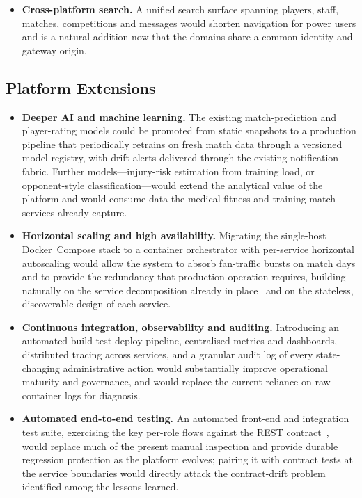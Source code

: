 \begin{itemize}
  \item \textbf{Cross-platform search.} A unified search surface spanning players, staff,
        matches, competitions and messages would shorten navigation for power users and is a
        natural addition now that the domains share a common identity and gateway origin.
\end{itemize}

\subsection{Platform Extensions}

\begin{itemize}
  \item \textbf{Deeper AI and machine learning.} The existing match-prediction and
        player-rating models could be promoted from static snapshots to a production
        pipeline that periodically retrains on fresh match data through a versioned
        model registry, with drift alerts delivered through the existing notification
        fabric. Further models---injury-risk estimation from training load, or
        opponent-style classification---would extend the analytical value of the
        platform and would consume data the medical-fitness and training-match services
        already capture.

  \item \textbf{Horizontal scaling and high availability.} Migrating the
        single-host Docker~Compose stack to a container orchestrator with
        per-service horizontal autoscaling would allow the system to absorb fan-traffic
        bursts on match days and to provide the redundancy that production operation
        requires, building naturally on the service decomposition already in
        place~\cite{microservices} and on the stateless, discoverable design of each
        service.

  \item \textbf{Continuous integration, observability and auditing.} Introducing an
        automated build-test-deploy pipeline, centralised metrics and dashboards,
        distributed tracing across services, and a granular audit log of every
        state-changing administrative action would substantially improve operational
        maturity and governance, and would replace the current reliance on raw container
        logs for diagnosis.

  \item \textbf{Automated end-to-end testing.} An automated front-end and integration
        test suite, exercising the key per-role flows against the REST
        contract~\cite{restapi}, would replace much of the present manual inspection
        and provide durable regression protection as the platform evolves; pairing it with
        contract tests at the service boundaries would directly attack the contract-drift
        problem identified among the lessons learned.


\end{itemize}
